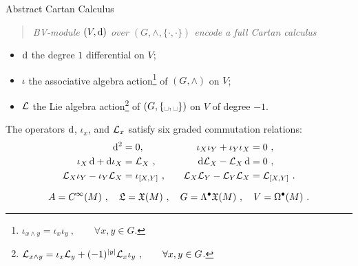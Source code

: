 \documentclass[beamer,10pt]{standalone}
\begin{document}
\begin{frame}{Abstract Cartan Calculus}
  \begin{quote}
    \centering
    \emph{BV-module $(V,\mathop{}\!\mathrm{d})$ over $(G,\wedge,\lbrace\cdot,\cdot\rbrace)$ encode a full Cartan calculus}
  \end{quote}
  \vfill\pause
  \begin{denotblock}
    \begin{itemize}
      \item $\mathop{}\!\mathrm{d}$ the degree $1$ differential on $V$;
	    \item $\iota$ the associative algebra action\footnote{$\iota_{x\wedge y}=\iota_x\iota_y~, \qquad \forall x,y\in G$.} of $(G,\wedge)$ on $V$;
  	  \item $\mathcal{L}$ the Lie algebra action\footnote{$\mathcal{L}_{x\wedge y}=\iota_x\mathcal{L}_y + (-1)^{|y|}\mathcal{L}_x \iota_y~, \qquad \forall  x,y\in G$.} of $(G,\{\blank,\blank\})$ on $V$ of degree $-1$.
    \end{itemize}   
  \end{denotblock}
  \vfill\pause

  \begin{lemblock}
 The operators $\mathop{}\!\mathrm{d}$, $\iota_x$, and $\mathcal{L}_x$ satisfy six graded commutation relations:
  \begin{align*}
	  \mathop{}\!\mathrm{d}^2                            &= 0,            &&&
	\iota_X \iota_Y + \iota_Y \iota_X  &= 0 ~,         \\
\iota_X \mathop{}\!\mathrm{d}   +	\mathop{}\!\mathrm{d} \iota_X      &= \mathcal{L}_X ~,    &&&
	\mathop{}\!\mathrm{d} \mathcal{L}_X - \mathcal{L}_X \mathop{}\!\mathrm{d}          &= 0 ~,    \\
	\mathcal{L}_X \iota_Y - \iota_Y \mathcal{L}_X    &= \iota_{[X,Y]}~,  &&&
	\mathcal{L}_X \mathcal{L}_Y - \mathcal{L}_Y \mathcal{L}_X      &= \mathcal{L}_{[X,Y]}~. 
\end{align*}
  \end{lemblock}
  \vfill\pause

  \begin{exblock}
    \vspace{-0.5em}
    $$ A=C^\infty(M)~,  \quad \mathfrak{L}=\mathfrak{X}(M)~,\quad
     G=\Lambda^\bullet \mathfrak{X}(M)~, \quad V=\Omega^\bullet(M)~. $$
  \end{exblock}
\end{frame}
\end{document}
